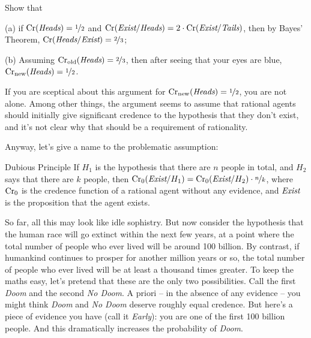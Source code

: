 \begin{exercise2}
  Show that
  \begin{enumerate*}
  \item[(a)] if $\text{Cr}(\emph{Heads}) = \nicefrac{1}{2}$ and
    $\text{Cr}(\emph{Exist}/\emph{Heads}) = 2 \cdot
    \text{Cr}(\emph{Exist}/\emph{Tails})$, then by Bayes' Theorem,
    $\text{Cr}(\emph{Heads}/\emph{Exist}) = \nicefrac{2}{3}$;
  \item[(b)] Assuming
    $\text{Cr}_\text{old}(\emph{Heads}) = \nicefrac{2}{3}$, then after
    seeing that your eyes are blue,
    $\text{Cr}_\text{new}(\emph{Heads}) = \nicefrac{1}{2}$.
  \end{enumerate*}
  \vspace{-5mm}
\end{exercise2}

If you are sceptical about this argument for $\text{Cr$_{\text{new}}$}(\emph{Heads}) =
\nicefrac{1}{2}$, you are not alone. Among other things, the argument seems to
assume that rational agents should initially give significant credence
to the hypothesis that they don't exist, and it's not clear why that
should be a requirement of rationality.

Anyway, let's give a name to the problematic assumption:
\begin{genericthm}{Dubious Principle}
  If $H_1$ is the hypothesis that there are $n$ people in total, and
  $H_2$ says that there are $k$ people, then $\text{Cr}_0(\emph{Exist} /
  H_1) = \text{Cr}_0(\emph{Exist}/H_2) \cdot \nicefrac{n}{k}$, where $\text{Cr}_0$
  is the credence function of a rational agent without any evidence,
  and $\emph{Exist}$ is the proposition that the agent exists.
\end{genericthm}

So far, all this may look like idle sophistry. But now consider the
hypothesis that the human race will go extinct within the next few
years, at a point where the total number of people who ever lived will
be around 100 billion. By contrast, if humankind continues to prosper
for another million years or so, the total number of people who ever
lived will be at least a thousand times greater. To keep the maths
easy, let's pretend that these are the only two possibilities. Call
the first \emph{Doom} and the second \emph{No Doom}. A priori -- in
the absence of any evidence -- you might think \emph{Doom} and
\emph{No Doom} deserve roughly equal credence. But here's a piece of
evidence you have (call it \emph{Early}): you are one of the first 100
billion people. And this dramatically increases the probability of
\emph{Doom}.

